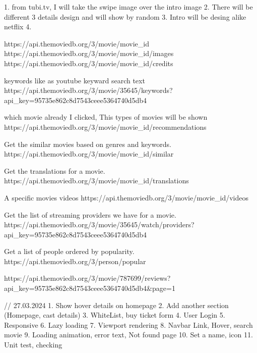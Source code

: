 1. from tubi.tv, I will take the swipe image over the intro image
2. There will be different 3 details design and will show by random
3. Intro will be desing alike netflix
4.

https://api.themoviedb.org/3/movie/{movie_id}
https://api.themoviedb.org/3/movie/{movie_id}/images
https://api.themoviedb.org/3/movie/{movie_id}/credits

keywords like as youtube keyward search text
https://api.themoviedb.org/3/movie/35645/keywords?api_key=95735e862c8d7543ceee5364740d5db4

which movie already I clicked, This types of movies will be shown
https://api.themoviedb.org/3/movie/{movie_id}/recommendations

Get the similar movies based on genres and keywords.
https://api.themoviedb.org/3/movie/{movie_id}/similar

Get the translations for a movie.
https://api.themoviedb.org/3/movie/{movie_id}/translations

A specific movies videos
https://api.themoviedb.org/3/movie/{movie_id}/videos

Get the list of streaming providers we have for a movie.
https://api.themoviedb.org/3/movie/35645/watch/providers?api_key=95735e862c8d7543ceee5364740d5db4

Get a list of people ordered by popularity.
https://api.themoviedb.org/3/person/popular

https://api.themoviedb.org/3/movie/787699/reviews?api_key=95735e862c8d7543ceee5364740d5db4&page=1

// 27.03.2024
1. Show hover details on homepage
2. Add another section (Homepage, cast details)
3. WhiteList, buy ticket form
4. User Login
5. Responsive
6. Lazy loading
7. Viewport rendering
8. Navbar Link, Hover, search movie
9. Loading animation, error text, Not found page
10. Set a name, icon
11. Unit test, checking